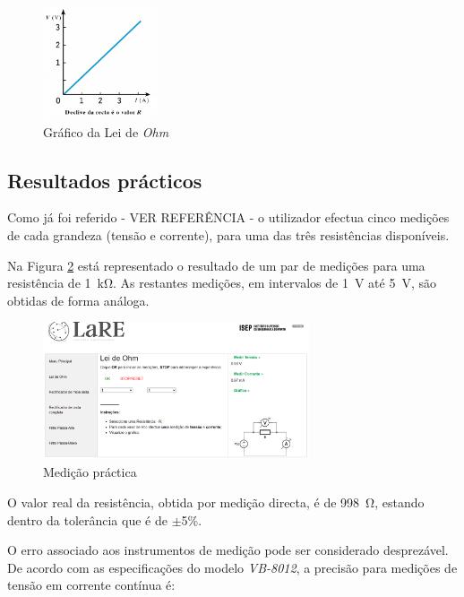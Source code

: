 \begin{figure}[hbtp]
	\centering
	\includegraphics[width=0.3\textwidth]{figures/grafico_Ohm.png}
	\caption{Gráfico da Lei de \textit{Ohm}}
	\label{fig:graphohmrepetido}
\end{figure}

\subsection{Resultados prácticos}
\label{sec:resultados_praticos}
Como já foi referido - VER REFERÊNCIA - o utilizador efectua cinco medições de cada grandeza (tensão e corrente), para uma das três resistências disponíveis.

Na Figura \ref{fig:resultados_medicoes_1k} está representado o resultado de um par de medições para uma resistência de \SI{1}{\kilo\ohm}. As restantes medições, em intervalos de \SI{1}{\volt} até \SI{5}{\volt}, são obtidas de forma análoga.

\begin{figure}[hbtp]
	\centering
	\includegraphics[width=0.7\textwidth]{figures/resultados_medicoes_ohm.png}
	\caption{Medição práctica}
	\label{fig:resultados_medicoes_1k}
\end{figure}

O valor real da resistência, obtida por medição directa, é de \SI{998}{\ohm}, estando dentro da tolerância que é de $\pm$5\%.

O erro associado aos instrumentos de medição pode ser considerado desprezável. De acordo com as especificações do modelo \textit{VB-8012}\cite{datasheetvb8012}, a precisão para medições de tensão em corrente contínua é:


